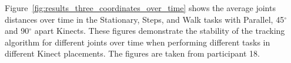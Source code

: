 Figure~\ref{fig:results_three_coordinates_over_time} shows the average joints distances over time in the Stationary, Steps, and Walk tasks with Parallel, 45$^{\circ}$ and 90$^{\circ}$ apart Kinects. These figures demonstrate the stability of the tracking algorithm for different joints over time when performing different tasks in different Kinect placements. The figures are taken from participant 18.


\begin{figure}[!h]
  \centering

   \\
\end{figure}

